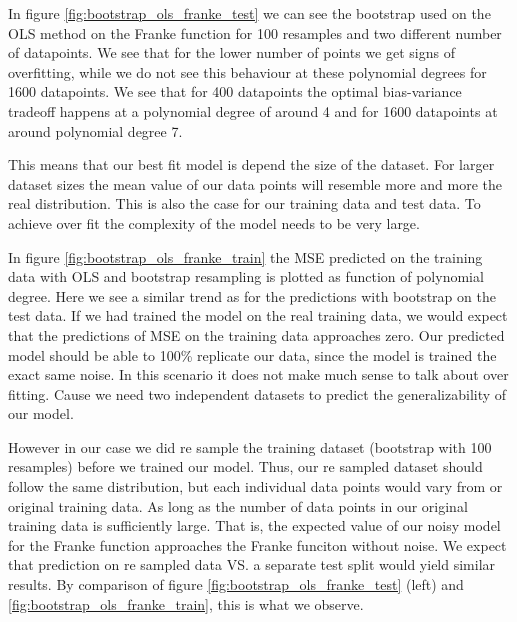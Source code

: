 In figure \ref{fig:bootstrap_ols_franke_test} we can see the bootstrap used
on the OLS method on the Franke function for 100 resamples and two different
number of datapoints. We see that for the lower number of points we get signs
of overfitting, while we do not see this behaviour at these polynomial degrees
for 1600 datapoints. We see that for 400 datapoints the optimal bias-variance
tradeoff happens at a polynomial degree of around 4 and for 1600 datapoints at
around polynomial degree 7. 

This means that our best fit model is depend the size of the dataset. For
larger dataset sizes the mean value of our data points will resemble more and
more the real distribution. This is also the case for our training data and
test data. To achieve over fit the complexity of the model needs to be very
large.  

In figure \ref{fig:bootstrap_ols_franke_train} the MSE predicted on the training
data with OLS and bootstrap resampling is plotted as function of polynomial
degree. Here we see a similar trend as for the predictions with bootstrap on
the test data. If we had trained the model on the real training data, we would
expect that the predictions of MSE on the training data approaches zero. Our
predicted model should be able to 100\% replicate our data, since the model is
trained the exact same noise. In this scenario it does not make much sense to
talk about over fitting. Cause we need two independent datasets to predict the
generalizability of our model. 

However in our case we did re sample the training dataset (bootstrap with 100
resamples) before we trained our
model. Thus, our re sampled dataset should follow the same distribution, but each
individual data points would vary from or original training data. As long as
the number of data points in our original training data is sufficiently large.
That is, the expected value of our noisy model for the Franke function
approaches the Franke funciton without noise. We expect that prediction on
re sampled data VS. a separate test split would yield similar results. By
comparison of figure \ref{fig:bootstrap_ols_franke_test} (left) and
\ref{fig:bootstrap_ols_franke_train}, this is what we observe. 

